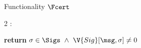 \begin{interface}[nofloat]{Functionality $\Fcert$ \\
}
{\begin{multicols}{2}
:
\begin{algorithmic}[1]
\algcont
\State \textbf{return} $\sigma \in \Sigs \ \wedge\ \V{Sig}[\msg,\sigma] \neq 0$ \label{ln:certclean}
\algsave
\end{algorithmic}
\end{multicols}}
\end{interface}
